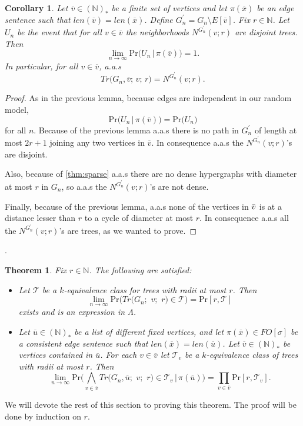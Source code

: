 \documentclass[12pt,notitlepage,a4paper]{article}
\newtheorem{theorem}{Theorem}[section]
\newtheorem{corollary}{Corollary}[section]
\theoremstyle{definition}
\newcommand{\N}{\mathbb{N}}
\newcommand{\Ln}{\lim\limits_{n\to \infty}}
\newcommand{\overbar}[1]{\mkern 1.5mu\overline{\mkern-1.5mu#1\mkern-1.5mu}\mkern 1.5mu}
\newcommand{\PR}[1]{\mathrm{Pr}\big(#1\big)}
\begin{document}
\begin{corollary}\label{cor:disjointtrees}
	Let $\overline{v}\in (\N)_*$ be a finite set of vertices 
	and let $\pi(\overline{x})$ be an edge sentence such that
	$len(\overline{v})=len(\overline{x})$. 
	Define $G_n^\prime=G_n \setminus E[\overline{v}]$. 
	Fix $r\in \N$.
	Let $U_n$ be the event that for all $v\in \overline{v}$
	the neighborhoods $N^{G^\prime_n}(v;r)$ are disjoint trees.
	Then
	\[
	\Ln \PR{U_n \, \big| \, \pi(\overline{v})}=1.\]
	In particular, for all $v\in \overline{v}$, a.a.s
	\[
	Tr\big(G_n,\overline{v};\, v;\, r)=N^{G^\prime_n}(v;r).
	\]
\end{corollary}
\begin{proof}
	As in the previous lemma, because edges are independent 
	in our random model, \[
	\PR{U_n \, \big| \, \pi(\overline{v})}
	=\PR{U_n}\]
	 for all $n$. Because of the previous lemma
	a.a.s there is no path in $G^\prime_n$ of length at most $2r+1$ joining 
	any two vertices in $\overline{v}$. In consequence a.a.s
	the $N^{G^\prime_n}(v;r)$'s are disjoint.\par
	Also, because of \cref{thm:sparse} a.a.s there are no dense
	hypergraphs with diameter at most $r$ in $G_n$, 
	so a.a.s the  $N^{G^\prime_n}(v;r)$'s are not dense.\par
	Finally, because of the previous lemma, a.a.s 
	none of the vertices in $\overbar{v}$ is at a distance
	lesser than $r$ to a cycle of diameter at most $r$.
	In consequence a.a.s all the $N^{G^\prime_n}(v;r)$'s are trees, 
	as we wanted to prove. 	 
\end{proof}
.

\begin{theorem} \label{thm:BigTrees}
	Fix $r\in \N$. The following are satisfied:
	\begin{itemize}
		\item[(1)] Let $\mathcal{T}$ be a
		$k$-equivalence class for trees with radii at most $r$.
		Then 
		\[
		\Ln  \PR{Tr\big(G_n;\,\,v;\,\,r\big)\in \mathcal{T}}
		=\mathrm{Pr}[r,\mathcal{T}]
		\]
		exists and is an expression
		in $\Lambda$.
		\item[(2)] Let $\overline{u}\in (\N)_*$ be a list of different fixed 
		vertices, and let $\pi(\overline{x})\in FO[\sigma]$ be a consistent
		edge sentence such that 
		$len(\overline{x})=len(\overline{u})$.
		Let $\overline{v}\in (\N)_*$ be vertices contained
		in $\overline{u}$. For each $v\in \overline{v}$
		let $\mathcal{T}_v$ be a $k$-equivalence class
		of trees with radii	at most $r$. Then
		\[
		\Ln \mathrm{Pr}\big( \bigwedge_{v\in \overline{v}} 
		Tr\big(G_n, \overline{u};\,\,v;\,\,r\big)\in \mathcal{T}_v 
		\, | \, \pi(\overline{u})
		\big)= \prod_{v\in \overline{v}} \mathrm{Pr}[r,\mathcal{T}_v]. \]	 	
	\end{itemize}
\end{theorem}
	We will devote the rest of this section to proving this
	theorem. The proof will be done by induction on $r$. 
	
\end{document}
